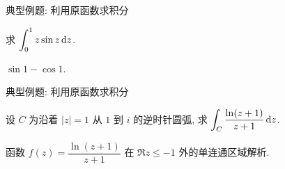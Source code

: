 \begin{frame}{典型例题: 利用原函数求积分}
\onslide<+->
\begin{exercise}
求 $\displaystyle\int_0^1 z\sin z\,\mathrm{d} z$.
\end{exercise}
\onslide<+->

\begin{answer}
$\sin 1-\cos 1$.
\end{answer}
\end{frame}


\begin{frame}{典型例题: 利用原函数求积分}
\onslide<+->
\begin{example}
设 $C$ 为沿着 $|z|=1$ 从 $1$ 到 $i$ 的逆时针圆弧, 求 $\displaystyle\int_C\frac{\ln(z+1)}{z+1}\,\mathrm{d} z$.
\end{example}
\onslide<+->
\begin{solution}
函数 $f(z)=\dfrac{\ln(z+1)}{z+1}$ 在 $\Re z\le -1$ 外的单连通区域解析.
\vspace{-0.5\baselineskip}
\onslide<+->{
	\[\int\frac{\ln(z+1)}{z+1}\diff z
=\int\ln(z+1)\diff[\ln(z+1)]=\frac12\ln^2(z+1)+c.\]}
\vspace{-1.1\baselineskip}
\end{solution}
\end{frame}


